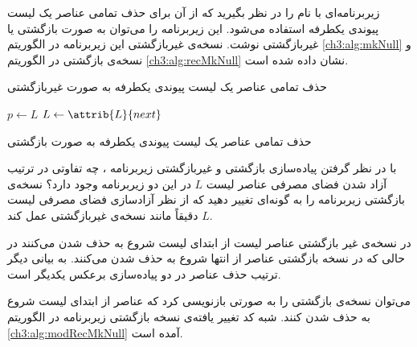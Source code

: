 

 زیربرنامه‌ای با نام {} را در نظر بگیرید که از آن برای حذف تمامی عناصر یک لیست پیوندی یکطرفه استفاده می‌شود. این زیربرنامه را می‌توان به صورت بازگشتی یا غیربازگشتی نوشت. نسخه‌ی غیربازگشتی این زیربرنامه در الگوریتم {\eqref{ch3:alg:mkNull}} و نسخه‌ی بازگشتی در الگوریتم {\eqref{ch3:alg:recMkNull}} نشان داده شده است.

\begin{algorithm}
\caption{حذف تمامی عناصر یک لیست پیوندی یکطرفه به صورت غیربازگشتی}\label{ch3:alg:mkNull}
\begin{latin}
\begin{algorithmic}[1]
				\State	$p \gets L$
				\State	$L \gets \attrib{L}{next}$
				\State	{}
		\EndWhile
\EndProcedure
\end{algorithmic}
\end{latin}
\end{algorithm}

\begin{algorithm}
\caption{حذف تمامی عناصر یک لیست پیوندی یکطرفه به صورت بازگشتی}\label{ch3:alg:recMkNull}
\begin{latin}
\begin{algorithmic}[1]
				\State \Return
		\Else
				\State	{}
				\State	{}
		\EndIf
\EndProcedure
\end{algorithmic}
\end{latin}
\end{algorithm}


با در نظر گرفتن پیاده‌سازی بازگشتی و غیربازگشتی زیربرنامه {}، چه تفاوتی در ترتیب آزاد شدن فضای مصرفی عناصر لیست {$L$} در این دو زیربرنامه وجود دارد؟ نسخه‌ی بازگشتی زیربرنامه را به گونه‌ای تغییر دهید که از نظر آزادسازی فضای مصرفی لیست {$L$} دقیقاً مانند نسخه‌ی غیربازگشتی عمل کند.


در نسخه‌ی غیر بازگشتی عناصر لیست از ابتدای لیست شروع به حذف شدن می‌کنند در حالی که در نسخه بازگشتی عناصر از انتها شروع به حذف شدن می‌کنند. به بیانی دیگر ترتیب حذف عناصر در دو پیاده‌سازی برعکس یکدیگر است.

می‌توان نسخه‌ی بازگشتی را به صورتی بازنویسی کرد که عناصر از ابتدای لیست شروع به حذف شدن کنند. شبه ‌کد تغییر یافته‌ی نسخه  بازگشتی زیربرنامه {} در الگوریتم {\eqref{ch3:alg:modRecMkNull}} آمده است.


